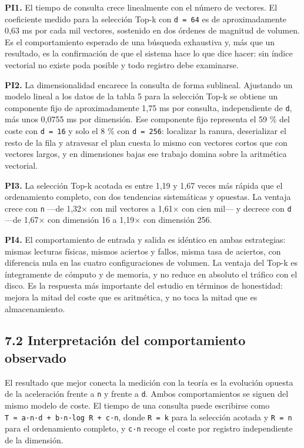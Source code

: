 \documentclass[11pt,a4paper]{article}
\let\pandocsubsection\subsection
\let\subsection\section
\let\subsubsection\pandocsubsection
\begin{document}
\textbf{PI1.} El tiempo de consulta crece linealmente con el número de
vectores. El coeficiente medido para la selección Top-k con
\texttt{d\ =\ 64} es de aproximadamente 0,63 ms por cada mil vectores,
sostenido en dos órdenes de magnitud de volumen. Es el comportamiento
esperado de una búsqueda exhaustiva y, más que un resultado, es la
confirmación de que el sistema hace lo que dice hacer: sin índice
vectorial no existe poda posible y todo registro debe examinarse.

\textbf{PI2.} La dimensionalidad encarece la consulta de forma
sublineal. Ajustando un modelo lineal a los datos de la tabla 5 para la
selección Top-k se obtiene un componente fijo de aproximadamente 1,75 ms
por consulta, independiente de \texttt{d}, más unos 0,0755 ms por
dimensión. Ese componente fijo representa el 59 \% del coste con
\texttt{d\ =\ 16} y solo el 8 \% con \texttt{d\ =\ 256}: localizar la
ranura, deserializar el resto de la fila y atravesar el plan cuesta lo
mismo con vectores cortos que con vectores largos, y en dimensiones
bajas ese trabajo domina sobre la aritmética vectorial.

\textbf{PI3.} La selección Top-k acotada es entre 1,19 y 1,67 veces más
rápida que el ordenamiento completo, con dos tendencias sistemáticas y
opuestas. La ventaja crece con \texttt{n} ---de 1,32× con mil vectores a
1,61× con cien mil--- y decrece con \texttt{d} ---de 1,67× con dimensión
16 a 1,19× con dimensión 256.

\textbf{PI4.} El comportamiento de entrada y salida es idéntico en ambas
estrategias: mismas lecturas físicas, mismos aciertos y fallos, misma
tasa de aciertos, con diferencia nula en las cuatro configuraciones de
volumen. La ventaja del Top-k es íntegramente de cómputo y de memoria, y
no reduce en absoluto el tráfico con el disco. Es la respuesta más
importante del estudio en términos de honestidad: mejora la mitad del
coste que es aritmética, y no toca la mitad que es almacenamiento.

\subsubsection{7.2 Interpretación del comportamiento
observado}\label{72-interpretaciuxf3n-del-comportamiento-observado}

El resultado que mejor conecta la medición con la teoría es la evolución
opuesta de la aceleración frente a \texttt{n} y frente a \texttt{d}.
Ambos comportamientos se siguen del mismo modelo de coste. El tiempo de
una consulta puede escribirse como
\texttt{T\ ≈\ a·n·d\ +\ b·n·log\ R\ +\ c·n}, donde \texttt{R\ =\ k} para
la selección acotada y \texttt{R\ =\ n} para el ordenamiento completo, y
\texttt{c·n} recoge el coste por registro independiente de la dimensión.
\end{document}
